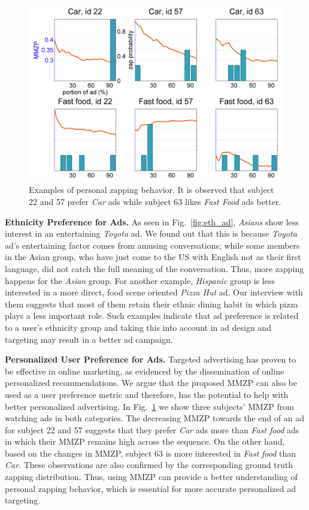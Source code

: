 \documentclass[twoside,leqno,twocolumn]{article}
\begin{document}
\begin{figure}[!t]
	\centering
		\includegraphics[width=\columnwidth]{fig/adcat_id.png}
	\caption{Examples of personal zapping behavior. It is observed that subject 22 and 57 prefer \textit{Car} ads while subject 63 likes \textit{Fast Food} ads better.}
	\label{fig:adcat_id}
\end{figure}

\noindent \textbf{Ethnicity Preference for Ads.} As seen in Fig.~\ref{fig:eth_ad}, \textit{Asians} show less interest in an entertaining \textit{Toyota} ad. We found out that this is because \textit{Toyota} ad's entertaining factor comes from amusing conversations; while some members in the Asian group, who have just come to the US with English not as their first language, did not catch the full meaning of the conversation. Thus, more zapping happens for the \textit{Asian} group. For another example, \textit{Hispanic} group is less interested in a more direct, food scene oriented \textit{Pizza Hut} ad. Our interview with them suggests that most of them retain their ethnic dining habit in which pizza plays a less important role. Such examples indicate that ad preference is related to a user's ethnicity group and taking this into account in ad design and targeting may result in a better ad campaign.




\noindent \textbf{Personalized User Preference for Ads.} Targeted advertising has proven to be effective in online marketing, as evidenced by the dissemination of online personalized recommendations. We argue that the proposed MMZP can also be used as a user preference metric and therefore, has the potential to help with better personalized advertising. In Fig.~\ref{fig:adcat_id} we show three subjects' MMZP from watching ads in both categories. The decreasing MMZP towards the end of an ad for subject 22 and 57 suggests that they prefer \textit{Car} ads more than \textit{Fast food} ads in which their MMZP remains high across the sequence. On the other hand, based on the changes in MMZP, subject 63 is more interested in \textit{Fast food} than \textit{Car}. These observations are also confirmed by the corresponding ground truth zapping distribution. Thus, using MMZP can provide a better understanding of personal zapping behavior, which is essential for more accurate personalized ad targeting.
\end{document}
